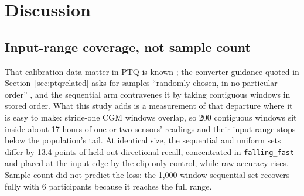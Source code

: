 \documentclass[10pt,twocolumn]{article}
\begin{document}
\section{Discussion}

\subsection{Input-range coverage, not sample count}
\label{sec:calibevidence}

That calibration data matter in PTQ is known
\cite{nagel2021whitepaper,cai2020zeroq,williams2024calibration,yu2021crossdomain};
the converter guidance quoted in Section~\ref{sec:ptqrelated} asks for
samples ``randomly chosen, in no particular order''
\cite{googleRepresentativeData}, and the sequential arm contravenes it by
taking contiguous windows in stored order. What this study adds is a
measurement of that departure where it is easy to make: stride-one CGM
windows overlap, so 200 contiguous windows sit inside about 17 hours of
one or two sensors' readings and their input range stops below the
population's tail. At identical size, the sequential and uniform sets
differ by 13.4 points of held-out directional recall, concentrated in \texttt{falling\_fast}
and placed at the input edge by the clip-only control, while raw accuracy
rises. Sample count did not predict the
loss: the 1,000-window sequential set recovers fully with 6 participants
because it reaches the full range.
\end{document}
